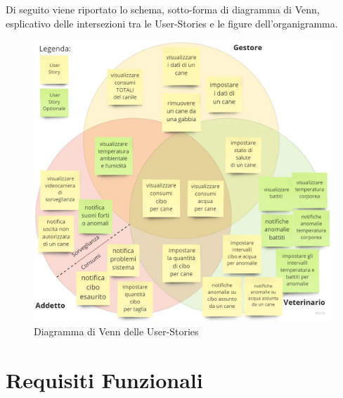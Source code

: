         Di seguito viene riportato lo schema, sotto-forma di diagramma di Venn, esplicativo delle intersezioni tra le User-Stories e le figure dell'organigramma. 
        \begin{figure}[ht]
            \caption{Diagramma di Venn delle User-Stories}
            \centering
            \includegraphics[width=1\textwidth]{Miro/DiagrammaUserStories.jpg}
        \end{figure}
    
	    
	\section{Requisiti Funzionali} %
